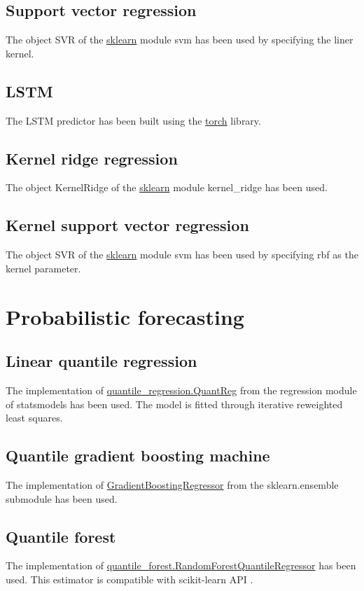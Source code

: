 \subsection{Support vector regression}
The object SVR of the \href{https://scikit-learn.org/stable/}{sklearn} module svm has been used by specifying the liner kernel.

\subsection{LSTM}
The LSTM predictor has been built using the \href{https://pytorch.org}{torch} library.

\subsection{Kernel ridge regression}
The object KernelRidge of the \href{https://scikit-learn.org/stable/}{sklearn} module kernel\_ridge has been used.

\subsection{Kernel support vector regression}
The object SVR of the \href{https://scikit-learn.org/stable/}{sklearn} module svm has been used by specifying rbf as the kernel parameter.

\section{Probabilistic forecasting}
\subsection{Linear quantile regression}
The implementation of \href{https://www.statsmodels.org/dev/generated/statsmodels.regression.quantile_regression.QuantReg.html}{quantile\_regression.QuantReg} from the regression module of statsmodels has been used.
The model is fitted through iterative reweighted least squares.
\subsection{Quantile gradient boosting machine}
The implementation of \href{https://scikit-learn.org/stable/modules/generated/sklearn.ensemble.GradientBoostingRegressor.html}{GradientBoostingRegressor} from the sklearn.ensemble submodule has been used.
\subsection{Quantile forest}
The implementation of \href{https://pypi.org/project/quantile-forest/}{quantile\_forest.RandomForestQuantileRegressor} has been used. This estimator is compatible with scikit-learn API \cite{Johnson2024}.
